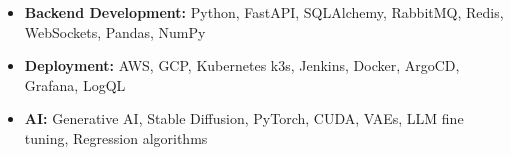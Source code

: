 
\begin{cvskills}

\setlength{\leftmargini}{1em}
\begin{itemize}
    \item \textbf{Backend Development:} Python, FastAPI, SQLAlchemy, RabbitMQ, Redis, WebSockets, Pandas, NumPy
    \item \textbf{Deployment:} AWS, GCP, Kubernetes k3s, Jenkins, Docker, ArgoCD, Grafana, LogQL
    \item \textbf{AI:} Generative AI, Stable Diffusion, PyTorch, CUDA, VAEs, LLM fine tuning, Regression algorithms
\end{itemize}

\end{cvskills}
